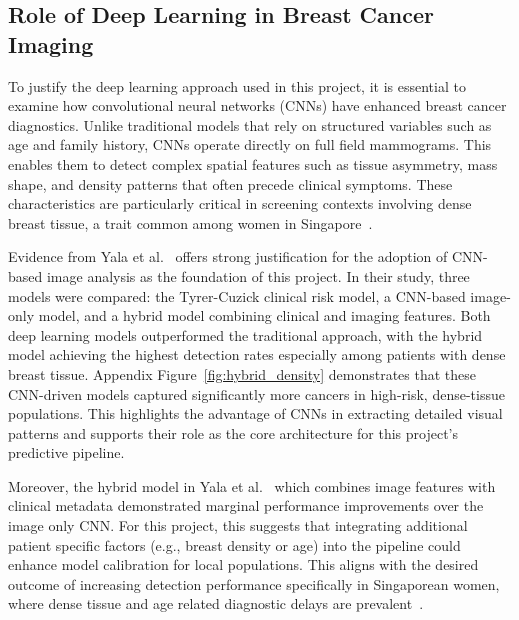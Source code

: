 \documentclass[12pt]{article}
\begin{document}


\subsection{Role of Deep Learning in Breast Cancer Imaging}

To justify the deep learning approach used in this project, it is essential to examine how convolutional neural networks (CNNs) have enhanced breast cancer diagnostics. Unlike traditional models that rely on structured variables such as age and family history, CNNs operate directly on full field mammograms. This enables them to detect complex spatial features such as tissue asymmetry, mass shape, and density patterns that often precede clinical symptoms. These characteristics are particularly critical in screening contexts involving dense breast tissue, a trait common among women in Singapore~\cite{6}.

Evidence from Yala et al.~\cite{1} offers strong justification for the adoption of CNN-based image analysis as the foundation of this project. In their study, three models were compared: the Tyrer-Cuzick clinical risk model, a CNN-based image-only model, and a hybrid model combining clinical and imaging features. Both deep learning models outperformed the traditional approach, with the hybrid model achieving the highest detection rates especially among patients with dense breast tissue. Appendix Figure~\ref{fig:hybrid_density} demonstrates that these CNN-driven models captured significantly more cancers in high-risk, dense-tissue populations. This highlights the advantage of CNNs in extracting detailed visual patterns and supports their role as the core architecture for this project’s predictive pipeline.

Moreover, the hybrid model in Yala et al.~\cite{1} which combines image features with clinical metadata demonstrated marginal performance improvements over the image only CNN. For this project, this suggests that integrating additional patient specific factors (e.g., breast density or age) into the pipeline could enhance model calibration for local populations. This aligns with the desired outcome of increasing detection performance specifically in Singaporean women, where dense tissue and age related diagnostic delays are prevalent~\cite{6,10}.
\end{document}
